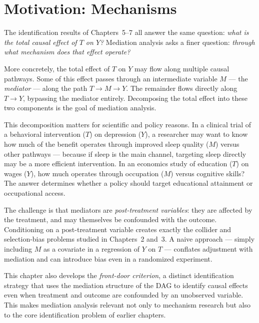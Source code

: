 \documentclass[master.tex]{subfiles}
\begin{document}

\section{Motivation: Mechanisms}
\label{w8:sec:motivation}

The identification results of Chapters~5--7 all answer the same
question: \emph{what is the total causal effect of $T$ on $Y$?}
Mediation analysis asks a finer question: \emph{through what mechanism
does that effect operate?}

More concretely, the total effect of $T$ on $Y$ may flow along multiple
causal pathways.  Some of this effect passes through an intermediate
variable $M$ --- the \emph{mediator} --- along the path $T \to M \to Y$.
The remainder flows directly along $T \to Y$, bypassing the mediator
entirely.  Decomposing the total effect into these two components is the
goal of mediation analysis.

This decomposition matters for scientific and policy reasons.  In a
clinical trial of a behavioral intervention ($T$) on depression ($Y$),
a researcher may want to know how much of the benefit operates through
improved sleep quality ($M$) versus other pathways --- because if sleep
is the main channel, targeting sleep directly may be a more efficient
intervention.  In an economics study of education ($T$) on wages ($Y$),
how much operates through occupation ($M$) versus cognitive skills?
The answer determines whether a policy should target educational
attainment or occupational access.

The challenge is that mediators are \emph{post-treatment variables}:
they are affected by the treatment, and may themselves be confounded
with the outcome.  Conditioning on a post-treatment variable creates
exactly the collider and selection-bias problems studied in Chapters~2
and~3.  A naive approach --- simply including $M$ as a covariate in a
regression of $Y$ on $T$ --- conflates adjustment with mediation and
can introduce bias even in a randomized experiment.

\medskip\noindent This chapter also develops the \emph{front-door
criterion}, a distinct identification strategy that uses the mediation
structure of the DAG to identify causal effects even when treatment and
outcome are confounded by an unobserved variable.  This makes
mediation analysis relevant not only to mechanism research but also to
the core identification problem of earlier chapters.
\end{document}
